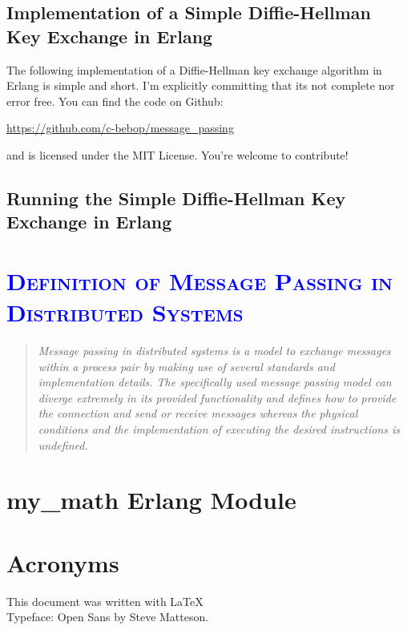 \documentclass[xcolor=dvipsnames]{article}
\begin{document}
\subsection{Implementation of a Simple Diffie-Hellman Key Exchange in Erlang}

The following implementation of a Diffie-Hellman key exchange algorithm in Erlang is simple and short. I'm explicitly committing that its not complete nor error free. You can find the code on Github:

\begin{center}
\url{https://github.com/c-bebop/message_passing}
\end{center}
and is licensed under the MIT License. You're welcome to contribute!



\subsection{Running the Simple Diffie-Hellman Key Exchange in Erlang}

\section{\scshape{\textcolor{blue}{Definition of Message Passing in Distributed Systems}}}

\begin{quote}
\textit{Message passing in distributed systems is a model to exchange messages within a process pair by making use of several standards and implementation details. The specifically used message passing model can diverge extremely in its provided functionality and defines how to provide the connection and send or receive messages whereas the physical conditions and the implementation of executing the desired instructions is undefined.}
\end{quote}

\newpage

\begin{appendix}

\section{my\_math Erlang Module}\label{my_math}



\section{Acronyms}

\printnoidxglossaries

\end{appendix}

\newpage




\vfill
\begin{center}
This document was written with \LaTeX 
\\Typeface: Open Sans by Steve Matteson.
\end{center}

\end{document}
